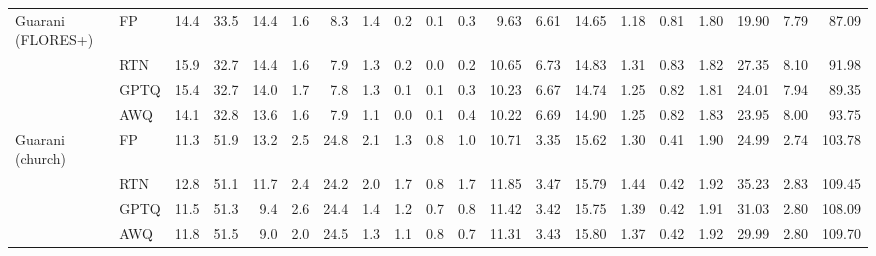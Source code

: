 \begin{landscape}
\begin{longtable}{llrrrrrrrrrrrrrrrrrr}
\midrule
Guarani (FLORES+) & FP & 14.4 & 33.5 & 14.4 & 1.6 & 8.3 & 1.4 & 0.2 & 0.1 & 0.3 & 9.63 & 6.61 & 14.65 & 1.18 & 0.81 & 1.80 & 19.90 & 7.79 & 87.09 \\
 & RTN & 15.9 & \cellcolor{loss!11}32.7 & \cellcolor{loss!0}14.4 & 1.6 & \cellcolor{loss!5}7.9 & \cellcolor{loss!2}1.3 & 0.2 & 0.0 & 0.2 & \cellcolor{loss!54}10.65 & \cellcolor{loss!6}6.73 & \cellcolor{loss!9}14.83 & \cellcolor{loss!56}1.31 & \cellcolor{loss!9}0.83 & \cellcolor{loss!9}1.82 & \cellcolor{loss!20}27.35 & \cellcolor{loss!1}8.10 & \cellcolor{loss!13}91.98 \\
 & GPTQ & 15.4 & \cellcolor{loss!11}32.7 & \cellcolor{loss!6}14.0 & 1.7 & \cellcolor{loss!6}7.8 & \cellcolor{loss!2}1.3 & 0.1 & 0.1 & \cellcolor{loss!1}0.3 & \cellcolor{loss!32}10.23 & \cellcolor{loss!3}6.67 & \cellcolor{loss!5}14.74 & \cellcolor{loss!32}1.25 & \cellcolor{loss!4}0.82 & \cellcolor{loss!3}1.81 & \cellcolor{loss!11}24.01 & \cellcolor{loss!0}7.94 & \cellcolor{loss!6}89.35 \\
 & AWQ & \cellcolor{loss!5}14.1 & \cellcolor{loss!9}32.8 & \cellcolor{loss!12}13.6 & \cellcolor{loss!1}1.6 & \cellcolor{loss!6}7.9 & \cellcolor{loss!4}1.1 & 0.0 & 0.1 & \cellcolor{loss!2}0.4 & \cellcolor{loss!31}10.22 & \cellcolor{loss!4}6.69 & \cellcolor{loss!13}14.90 & \cellcolor{loss!32}1.25 & \cellcolor{loss!4}0.82 & \cellcolor{loss!11}1.83 & \cellcolor{loss!11}23.95 & \cellcolor{loss!1}8.00 & \cellcolor{loss!18}93.75 \\
\midrule
Guarani (church) & FP & 11.3 & 51.9 & 13.2 & 2.5 & 24.8 & 2.1 & 1.3 & 0.8 & 1.0 & 10.71 & 3.35 & 15.62 & 1.30 & 0.41 & 1.90 & 24.99 & 2.74 & 103.78 \\
 & RTN & 12.8 & \cellcolor{loss!11}51.1 & \cellcolor{loss!21}11.7 & \cellcolor{loss!1}2.4 & \cellcolor{loss!8}24.2 & \cellcolor{loss!1}2.0 & \cellcolor{loss!10}1.7 & 0.8 & \cellcolor{loss!18}1.7 & \cellcolor{loss!60}11.85 & \cellcolor{loss!6}3.47 & \cellcolor{loss!9}15.79 & \cellcolor{loss!60}1.44 & \cellcolor{loss!4}0.42 & \cellcolor{loss!9}1.92 & \cellcolor{loss!27}35.23 & \cellcolor{loss!0}2.83 & \cellcolor{loss!15}109.45 \\
 & GPTQ & 11.5 & \cellcolor{loss!8}51.3 & \cellcolor{loss!54}9.4 & 2.6 & \cellcolor{loss!5}24.4 & \cellcolor{loss!10}1.4 & 1.2 & 0.7 & 0.8 & \cellcolor{loss!38}11.42 & \cellcolor{loss!4}3.42 & \cellcolor{loss!7}15.75 & \cellcolor{loss!38}1.39 & \cellcolor{loss!3}0.42 & \cellcolor{loss!5}1.91 & \cellcolor{loss!16}31.03 & \cellcolor{loss!0}2.80 & \cellcolor{loss!11}108.09 \\
 & AWQ & 11.8 & \cellcolor{loss!6}51.5 & \cellcolor{loss!60}9.0 & \cellcolor{loss!6}2.0 & \cellcolor{loss!4}24.5 & \cellcolor{loss!11}1.3 & 1.1 & 0.8 & 0.7 & \cellcolor{loss!32}11.31 & \cellcolor{loss!4}3.43 & \cellcolor{loss!10}15.80 & \cellcolor{loss!32}1.37 & \cellcolor{loss!3}0.42 & \cellcolor{loss!9}1.92 & \cellcolor{loss!13}29.99 & \cellcolor{loss!0}2.80 & \cellcolor{loss!16}109.70 \\

\end{longtable}
\end{landscape}
